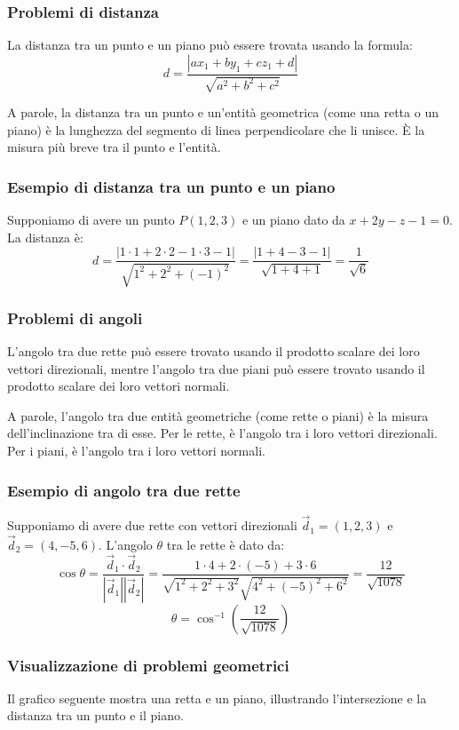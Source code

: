 \documentclass{article}
\begin{document}
\subsubsection{Problemi di distanza}
La distanza tra un punto e un piano può essere trovata usando la formula:
\[
    d = \frac{|ax_1 + by_1 + cz_1 + d|}{\sqrt{a^2 + b^2 + c^2}}
\]

A parole, la distanza tra un punto e un'entità geometrica (come una retta o un piano) è la
lunghezza del segmento di linea perpendicolare che li unisce. È la misura più breve tra il
punto e l'entità.

\subsubsection{Esempio di distanza tra un punto e un piano}
Supponiamo di avere un punto \(P(1, 2, 3)\) e un piano dato da \(x + 2y - z - 1 = 0\).
La distanza è:
\[
    d = \frac{|1 \cdot 1 + 2 \cdot 2 - 1 \cdot 3 - 1|}{\sqrt{1^2 + 2^2 + (-1)^2}} =
    \frac{|1 + 4 - 3 - 1|}{\sqrt{1 + 4 + 1}} = \frac{1}{\sqrt{6}}
\]

\subsubsection{Problemi di angoli}
L'angolo tra due rette può essere trovato usando il prodotto scalare dei loro vettori
direzionali, mentre l'angolo tra due piani può essere trovato usando il prodotto scalare dei
loro vettori normali.

A parole, l'angolo tra due entità geometriche (come rette o piani) è la misura
dell'inclinazione tra di esse. Per le rette, è l'angolo tra i loro vettori direzionali.
Per i piani, è l'angolo tra i loro vettori normali.

\subsubsection{Esempio di angolo tra due rette}
Supponiamo di avere due rette con vettori direzionali \(\vec{d}_1 = (1, 2, 3)\) e \(\vec{d}_2 = (4, -5, 6)\). L'angolo \(\theta\) tra le rette è dato da:
\[
    \cos \theta = \frac{\vec{d}_1 \cdot \vec{d}_2}{|\vec{d}_1||\vec{d}_2|} =
    \frac{1 \cdot 4 + 2 \cdot (-5) + 3 \cdot 6}{\sqrt{1^2 + 2^2 + 3^2}
    \sqrt{4^2 + (-5)^2 + 6^2}} = \frac{12}{\sqrt{1078}}
\]
\[
    \theta = \cos^{-1} \left( \frac{12}{\sqrt{1078}} \right)
\]

\subsubsection{Visualizzazione di problemi geometrici}
Il grafico seguente mostra una retta e un piano, illustrando l'intersezione e la distanza tra
un punto e il piano.
\end{document}
